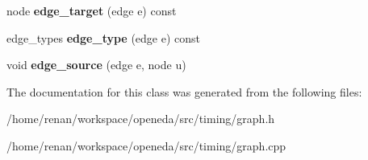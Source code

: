 \begin{DoxyCompactItemize}
\item 
\hypertarget{classophidian_1_1timing_1_1graph_a8f589ce4f52217cd65d0a5885da649de}{node {\bfseries edge\-\_\-target} (edge e) const }\label{classophidian_1_1timing_1_1graph_a8f589ce4f52217cd65d0a5885da649de}

\item 
\hypertarget{classophidian_1_1timing_1_1graph_ac3490d78fe7f9b7a0b61369f1e170f18}{edge\-\_\-types {\bfseries edge\-\_\-type} (edge e) const }\label{classophidian_1_1timing_1_1graph_ac3490d78fe7f9b7a0b61369f1e170f18}

\item 
\hypertarget{classophidian_1_1timing_1_1graph_a7104b3510c15b5e61b17e475b85ac108}{void {\bfseries edge\-\_\-source} (edge e, node u)}\label{classophidian_1_1timing_1_1graph_a7104b3510c15b5e61b17e475b85ac108}

\end{DoxyCompactItemize}


The documentation for this class was generated from the following files\-:\begin{DoxyCompactItemize}
\item 
/home/renan/workspace/openeda/src/timing/graph.\-h\item 
/home/renan/workspace/openeda/src/timing/graph.\-cpp\end{DoxyCompactItemize}
